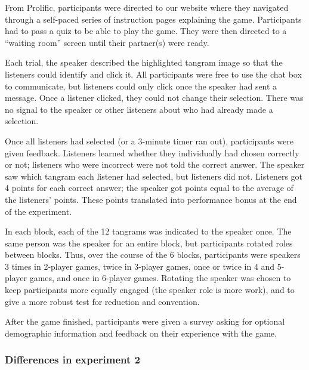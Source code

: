 \documentclass[
  english,
  a4paper,
]{article}
\begin{document}
From Prolific, participants were directed to our website where they navigated through a self-paced series of instruction pages explaining the game. Participants had to pass a quiz to be able to play the game. They were then directed to a ``waiting room'' screen until their partner(s) were ready.

Each trial, the speaker described the highlighted tangram image so that the listeners could identify and click it. All participants were free to use the chat box to communicate, but listeners could only click once the speaker had sent a message. Once a listener clicked, they could not change their selection. There was no signal to the speaker or other listeners about who had already made a selection.

Once all listeners had selected (or a 3-minute timer ran out), participants were given feedback. Listeners learned whether they individually had chosen correctly or not; listeners who were incorrect were not told the correct answer. The speaker saw which tangram each listener had selected, but listeners did not. Listeners got 4 points for each correct answer; the speaker got points equal to the average of the listeners' points. These points translated into performance bonus at the end of the experiment.

In each block, each of the 12 tangrams was indicated to the speaker once. The same person was the speaker for an entire block, but participants rotated roles between blocks. Thus, over the course of the 6 blocks, participants were speakers 3 times in 2-player games, twice in 3-player games, once or twice in 4 and 5-player games, and once in 6-player games. Rotating the speaker was chosen to keep participants more equally engaged (the speaker role is more work), and to give a more robust test for reduction and convention.

After the game finished, participants were given a survey asking for optional demographic information and feedback on their experience with the game.

\hypertarget{differences-in-experiment-2}{%
\subsubsection{Differences in experiment 2}\label{differences-in-experiment-2}}
\end{document}
